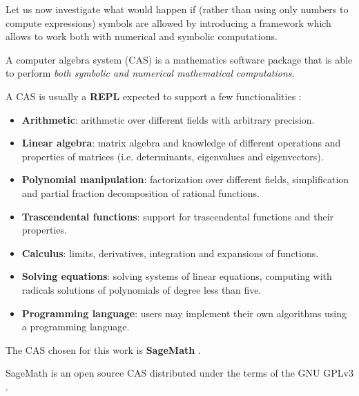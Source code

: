 Let us now investigate what would happen if (rather than using only numbers to compute expressions) symbols are allowed by introducing
a framework which allows to work both with numerical and symbolic computations.
\begin{definition}
    A computer algebra system (CAS) is a mathematics software package that is able to perform \textit{both symbolic and numerical
    mathematical computations}.
\end{definition}

A CAS is usually a \textbf{REPL} expected to support a few functionalities \cite{introcas}:
\begin{itemize}[topsep=0pt, itemsep=0pt, parsep=0pt]
    \item \textbf{Arithmetic}:
        arithmetic over different fields with arbitrary precision.
    \item \textbf{Linear algebra}:
        matrix algebra and knowledge of different operations and properties of matrices
        (i.e. determinants, eigenvalues and eigenvectors).
    \item \textbf{Polynomial manipulation}:
        factorization over different fields, simplification and partial fraction decomposition of rational functions.
    \item \textbf{Trascendental functions}:
        support for trascendental functions and their properties.
    \item \textbf{Calculus}:
        limits, derivatives, integration and expansions of functions.
    \item \textbf{Solving equations}:
        solving systems of linear equations, computing with radicals solutions of polynomials of degree less than five.
    \item \textbf{Programming language}:
        users may implement their own algorithms using a programming language.
\end{itemize}

The CAS chosen for this work is \textbf{SageMath} \cite{sage}.

SageMath is an open source CAS distributed under the terms of the GNU GPLv3 \cite{gpl}.

